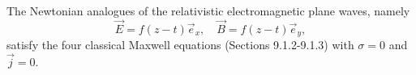 The Newtonian analogues of the relativistic electromagnetic plane waves, namely
$$\vec{E} = f(z - t) \vec{e}_x, \quad \vec{B} = f(z - t) \vec{e}_y,$$
satisfy the four classical Maxwell equations (Sections 9.1.2-9.1.3) with $\sigma = 0$ and $\vec{j} = 0$.